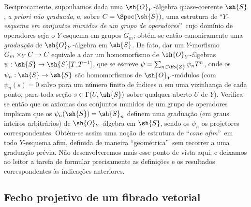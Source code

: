 \documentclass[oneside,10pt]{amsart}
\makeatletter
\newcommand{\ega@arrow}[2]{\mathchoice{#1}{#2}{#2}{#2}}
\renewcommand{\to}{\ega@arrow{\longrightarrow}{\rightarrow}}
\newcommand{\oldpage}[2][]{\marginnote{\normalfont\footnotesize\textbf{#1}~|~#2}\ignorespaces}
\let\EGAOriginalLabel\label
\renewcommand{\label}[1]{\phantomsection\EGAOriginalLabel{#1}}
\makeatother
\begin{document}
\begin{remark}[8.3.9]
Reciprocamente, suponhamos dada uma $\sh{O}_Y$-álgebra quase-coerente $\sh{S}$, \emph{a priori não graduada}, e, sobre $C=\Spec(\sh{S})$, uma estrutura de \textquotedblleft\emph{$Y$-esquema em conjuntos munidos de um grupo de operadores}\textquotedblright\ cujo domínio de operadores seja o $Y$-esquema em grupos $G_m$;
obtém-se então canonicamente uma \emph{graduação} de $\sh{O}_Y$-álgebra em $\sh{S}$.
De fato, dar um $Y$-morfismo $G_m\times_Y C\to C$ equivale a dar um homomorfismo de $\sh{O}_Y$-álgebras $\psi:\sh{S}\to\sh{S}[T,T^{-1}]$, que se escreve $\psi=\sum_{n\in\bb{Z}}\psi_n T^n$, onde os $\psi_n:\sh{S}\to\sh{S}$ são homomorfismos de $\sh{O}_Y$-módulos (com $\psi_n(s)=0$ salvo para um número finito de índices $n$ em uma vizinhança de cada ponto, para toda seção $s\in\Gamma(U,\sh{S})$ sobre qualquer aberto $U$ de $Y$).
Verifica-se então que os axiomas dos conjuntos munidos de um grupo de operadores implicam que os $\psi_n(\sh{S})=\sh{S}_n$ definem uma graduação (em graus inteiros arbitrários) de $\sh{O}_Y$-álgebra em $\sh{S}$, sendo os $\psi_n$ os projetores correspondentes.
Obtém-se assim uma noção de estrutura de \textquotedblleft\emph{cone afim}\textquotedblright\ em todo $Y$-esquema afim, definida de maneira \textquotedblleft geométrica\textquotedblright\ sem recorrer a uma graduação prévia.
\oldpage[II]{168}
Não desenvolveremos mais esse ponto de vista aqui, e deixamos ao leitor a tarefa de formular precisamente as definições e os resultados correspondentes às indicações anteriores.
\end{remark}
\subsection{Fecho projetivo de um fibrado vetorial}
\label{subsection:II.8.4}
\end{document}
